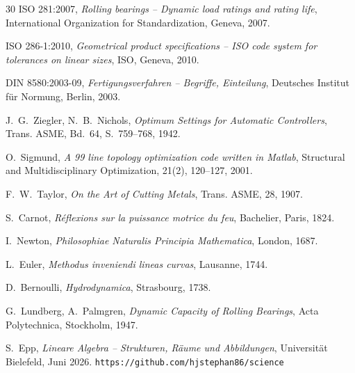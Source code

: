 ﻿\documentclass[a4paper,12pt]{report}
\theoremstyle{definition}
\begin{document}
\begin{thebibliography}{30}
ISO 281:2007,
\textit{Rolling bearings -- Dynamic load ratings and rating life},
International Organization for Standardization, Geneva, 2007.

ISO 286-1:2010,
\textit{Geometrical product specifications -- ISO code system for tolerances on linear sizes},
ISO, Geneva, 2010.

DIN 8580:2003-09,
\textit{Fertigungsverfahren -- Begriffe, Einteilung},
Deutsches Institut f\"ur Normung, Berlin, 2003.

J.~G.~Ziegler, N.~B.~Nichols,
\textit{Optimum Settings for Automatic Controllers},
Trans. ASME, Bd.~64, S.~759--768, 1942.

O.~Sigmund,
\textit{A 99 line topology optimization code written in Matlab},
Structural and Multidisciplinary Optimization, 21(2), 120--127, 2001.

F.~W.~Taylor,
\textit{On the Art of Cutting Metals},
Trans. ASME, 28, 1907.

S.~Carnot,
\textit{R\'eflexions sur la puissance motrice du feu},
Bachelier, Paris, 1824.

I.~Newton,
\textit{Philosophiae Naturalis Principia Mathematica},
London, 1687.

L.~Euler,
\textit{Methodus inveniendi lineas curvas},
Lausanne, 1744.

D.~Bernoulli,
\textit{Hydrodynamica},
Strasbourg, 1738.

G.~Lundberg, A.~Palmgren,
\textit{Dynamic Capacity of Rolling Bearings},
Acta Polytechnica, Stockholm, 1947.

S.~Epp,
\textit{Lineare Algebra -- Strukturen, R\"aume und Abbildungen},
Universit\"at Bielefeld, Juni 2026.
\texttt{https://github.com/hjstephan86/science}

\end{thebibliography}
\end{document}
